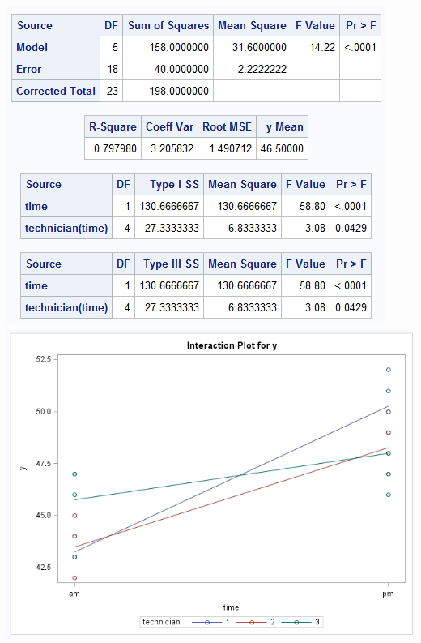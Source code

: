 \begin{center}
\includegraphics[scale=0.65]{NestedSAS1}\includegraphics[scale=0.4]{NestedSAS2}
\end{center}
